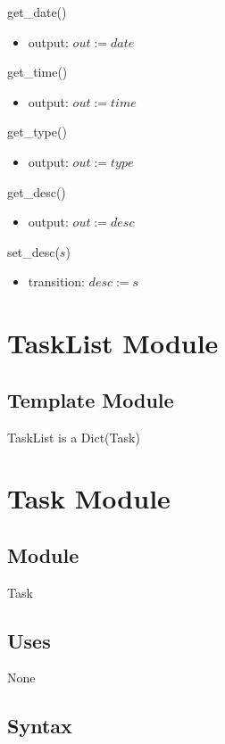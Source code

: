 \documentclass[12pt, titlepage]{article}
\begin{document}
\noindent get\_date()
\begin{itemize}
    \item output: $out := date$
\end{itemize}

\noindent get\_time()
\begin{itemize}
    \item output: $out := time$
\end{itemize}

\noindent get\_type()
\begin{itemize}
    \item output: $out := type$
\end{itemize}

\noindent get\_desc()
\begin{itemize}
    \item output: $out := desc$
\end{itemize}

\noindent set\_desc($s$)
\begin{itemize}
    \item transition: $desc := s$
\end{itemize}

\newpage

\section*{TaskList Module}

\subsection*{Template Module}
TaskList is a Dict(Task)

\newpage

\section*{Task Module}

\subsection*{Module}
Task

\subsection*{Uses}
None

\subsection* {Syntax}
\end{document}
